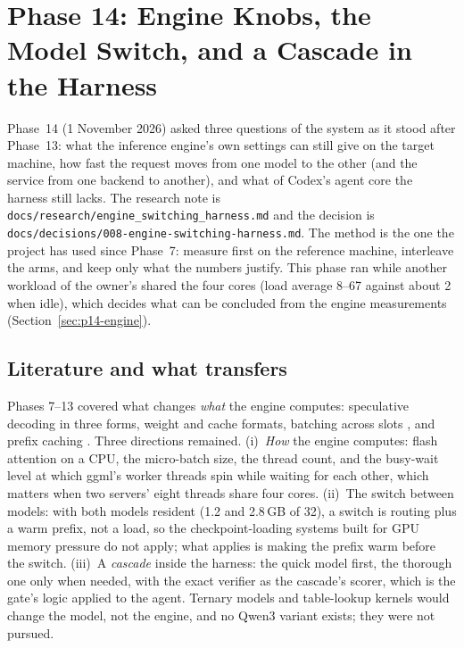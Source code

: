 \section{Phase 14: Engine Knobs, the Model Switch, and a Cascade in the Harness}
\label{sec:phase14}

Phase~14 (1 November 2026) asked three questions of the system as it stood after Phase~13: what the inference engine's own
settings can still give on the target machine, how fast the request moves from one model to the other (and the service from
one backend to another), and what of Codex's agent core the harness still lacks. The research note is
\texttt{docs/research/engine\_switching\_harness.md} and the decision is \texttt{docs/decisions/008-engine-switching-harness.md}.
The method is the one the project has used since Phase~7: measure first on the reference machine, interleave the arms, and
keep only what the numbers justify. This phase ran while another workload of the owner's shared the four cores (load average
8--67 against about 2 when idle), which decides what can be concluded from the engine measurements (Section~\ref{sec:p14-engine}).

\subsection{Literature and what transfers}

Phases 7--13 covered what changes \emph{what} the engine computes: speculative decoding \cite{leviathan2023speculative} in
three forms, weight and cache formats, batching across slots \cite{yu2022orca}, and prefix caching \cite{kwon2023pagedattention,
zheng2024sglang}. Three directions remained. (i)~\emph{How} the engine computes: flash attention on a CPU, the micro-batch
size, the thread count, and the busy-wait level at which ggml's worker threads spin while waiting for each other, which matters
when two servers' eight threads share four cores. (ii)~The switch between models: with both models resident (1.2 and 2.8\,GB of
32), a switch is routing plus a warm prefix, not a load, so the checkpoint-loading systems built for GPU memory pressure
\cite{fu2024serverlessllm} do not apply; what applies is making the prefix warm before the switch. (iii)~A \emph{cascade}
\cite{chen2023frugalgpt,yue2024cascades} inside the harness: the quick model first, the thorough one only when needed, with the
exact verifier as the cascade's scorer, which is the gate's logic applied to the agent. Ternary models and table-lookup kernels
\cite{ma2025bitnet,wei2024tmac} would change the model, not the engine, and no Qwen3 variant exists; they were not pursued.

